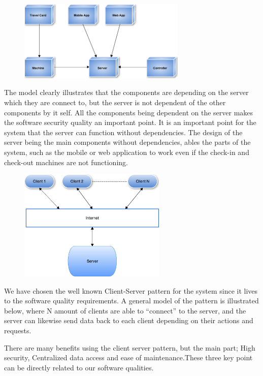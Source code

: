 \begin{figure}[ht!]
\centering
\includegraphics[width=80mm]{graphics/SA_pic_2.png}
\label{ano}
\end{figure}


The model clearly illustrates that the components are depending on the server which they are connect to, but the server is not dependent of the other components by it self. All the components being dependent on the server makes the software security quality an important point. It is an important point for the system that the server can function without dependencies. The  design of the server being the main components without dependencies, ables the parts of the system, such as the mobile or web application to work even if the check-in and check-out machines are not functioning.

\begin{figure}[ht!]
\centering
\includegraphics[width=70mm]{graphics/SA_pic_3.png}
\label{some}
\end{figure}

We have chosen the well known Client-Server pattern for the system since it lives to the software quality requirements. A general model of the pattern is illustrated below, where N amount of clients are able to “connect” to the server, and the server can likewise send data back to each client depending on their actions and requests.


There are many benefits using the client server pattern, but the main part; High security, Centralized data access and ease of maintenance.These three key point can be directly related to our software qualities. 



